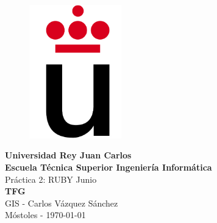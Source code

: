\setlength{\unitlength}{1 cm} %
\thispagestyle{empty}
\begin{figure}[htb]
\begin{center}
\includegraphics[width=4cm]{./imagenes/logoURJC}
\end{center}
\end{figure}
\begin{center}
\textbf{{\Huge Universidad Rey Juan Carlos}\\[0.5cm]
{\LARGE Escuela Técnica Superior Ingeniería Informática}}\\[1.25cm]
{\Large Práctica 2: RUBY Junio}\\[2.3cm]
{\LARGE \textbf{TFG}}\\[3cm]
{\large GIS - Carlos Vázquez Sánchez}\\[1cm]
Móstoles - \today
\end{center}